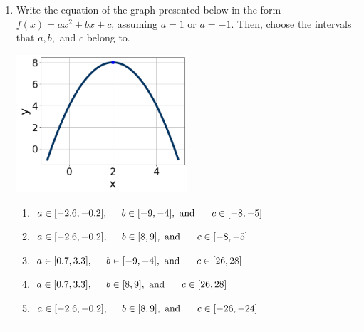 \documentclass[14pt]{extbook}
\newcommand{\litem}[1]{\item#1\hspace*{-1cm}\rule{\textwidth}{0.4pt}}
\begin{document}
\begin{enumerate}
{\begin{enumerate}[label=\Alph*.]
\end{enumerate} }
\litem{
Write the equation of the graph presented below in the form $f(x)=ax^2+bx+c$, assuming  $a=1$ or $a=-1$. Then, choose the intervals that $a, b,$ and $c$ belong to.
\begin{center}
    \includegraphics[width=0.5\textwidth]{../Figures/quadraticGraphToEquationCopyA.png}
\end{center}
\begin{enumerate}[label=\Alph*.]
\item \( a \in [-2.6, -0.2], \hspace*{5mm} b \in [-9, -4], \text{ and } \hspace*{5mm} c \in [-8, -5] \)
\item \( a \in [-2.6, -0.2], \hspace*{5mm} b \in [8, 9], \text{ and } \hspace*{5mm} c \in [-8, -5] \)
\item \( a \in [0.7, 3.3], \hspace*{5mm} b \in [-9, -4], \text{ and } \hspace*{5mm} c \in [26, 28] \)
\item \( a \in [0.7, 3.3], \hspace*{5mm} b \in [8, 9], \text{ and } \hspace*{5mm} c \in [26, 28] \)
\item \( a \in [-2.6, -0.2], \hspace*{5mm} b \in [8, 9], \text{ and } \hspace*{5mm} c \in [-26, -24] \)


\end{enumerate}}
\end{enumerate}
\end{document}
